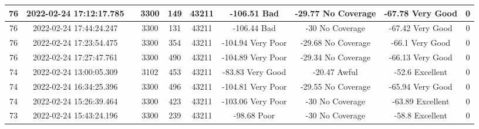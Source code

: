 \begin{longtable*}{|c|c|c|c|c|c|c|c|c|c|}
76&2022-02-24 17:12:17.785&&3300&149&43211& -106.51   Bad         & -29.77    No Coverage & -67.78    Very Good   & 0\\\hline
{}76&2022-02-24 17:44:24.247&&3300&131&43211& -106.44   Bad         & -30       No Coverage & -67.42    Very Good   & 0\\\hline
{}76&2022-02-24 17:23:54.475&&3300&354&43211& -104.94   Very Poor   & -29.68    No Coverage & -66.1     Very Good   & 0\\\hline
{}76&2022-02-24 17:27:47.761&&3300&490&43211& -104.89   Very Poor   & -29.34    No Coverage & -66.13    Very Good   & 0\\\hline
{}74&2022-02-24 13:00:05.309&&3102&453&43211& -83.83    Very Good   & -20.47    Awful       & -52.6     Excellent   & 0\\\hline
{}74&2022-02-24 16:34:25.396&&3300&496&43211& -104.81   Very Poor   & -29.55    No Coverage & -65.94    Very Good   & 0\\\hline
{}74&2022-02-24 15:26:39.464&&3300&423&43211& -103.06   Very Poor   & -30       No Coverage & -63.89    Excellent   & 0\\\hline
{}73&2022-02-24 15:43:24.196&&3300&239&43211& -98.68    Poor        & -30       No Coverage & -58.8     Excellent   & 0\\\hline

\end{longtable*}
